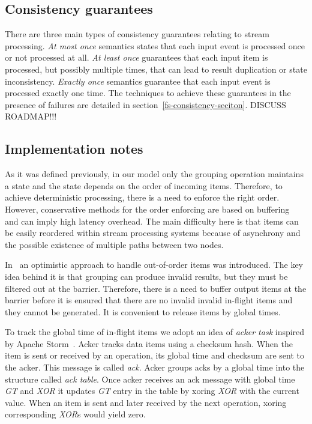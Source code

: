 \subsection{Consistency guarantees}
There are three main types of consistency guarantees relating to stream processing. {\it At most once} semantics states that each input event is processed once or not processed at all. {\it At least once} guarantees that each input item is processed, but possibly multiple times, that can lead to result duplication or state inconsistency. {\it Exactly once} semantics guarantee that each input event is processed exactly one time. The techniques to achieve these guarantees in the presence of failures are detailed in section~\ref{fs-consistency-seciton}. DISCUSS ROADMAP!!!

\subsection{Implementation notes}

As it was defined previously, in our model only the grouping operation maintains a state and the state depends on the order of incoming items. Therefore, to achieve deterministic processing, there is a need to enforce the right order. However, conservative methods for the order enforcing are based on buffering~\cite{Li:2008:OPN:1453856.1453890} and can imply high latency overhead. The main difficulty here is that items can be easily reordered within stream processing systems because of asynchrony and the possible existence of multiple paths between two nodes. 

In~\cite{we2018seim} an optimistic approach to handle out-of-order items was introduced. The key idea behind it is that grouping can produce invalid results, but they must be filtered out at the barrier. Therefore, there is a need to buffer output items at the barrier before it is ensured that there are no invalid invalid in-flight items and they cannot be generated. It is convenient to release items by global times.

To track the global time of in-flight items we adopt an idea of {\it acker task} inspired by Apache Storm~\cite{apache:storm}. Acker tracks data items using a checksum hash. When the item is sent or received by an operation, its global time and checksum are sent to the acker. This message is called {\it ack}. Acker groups acks by a global time into the structure called {\it ack table}. Once acker receives an ack message with global time {\it GT} and {\it XOR} it updates {\it GT} entry in the table by xoring {\it XOR} with the current value. When an item is sent and later received by the next operation, xoring corresponding {\it XOR}s would yield zero.

